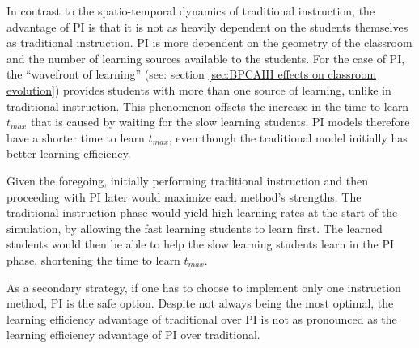 In contrast to the spatio-temporal dynamics of traditional instruction, the advantage of PI is that it is not as heavily dependent on the students themselves as traditional instruction.
PI is more dependent on the geometry of the classroom and the number of learning sources available to the students.
For the case of PI, the ``wavefront of learning'' (see: section \ref{sec:BPCAIH effects on classroom evolution}) provides students with more than one source of learning, unlike in traditional instruction. 
This phenomenon offsets the increase in the time to learn $t_{max}$ that is caused by waiting for the slow learning students.
PI models therefore have a shorter time to learn $t_{max}$, even though the traditional model initially has better learning efficiency.

Given the foregoing, initially performing traditional instruction and then proceeding with PI later would maximize each method's strengths. 
The traditional instruction phase would yield high learning rates at the start of the simulation, by allowing the fast learning students to learn first.
The learned students would then be able to help the slow learning students learn in the PI phase, shortening the time to learn $t_{max}$.

As a secondary strategy, if one has to choose to implement only one instruction method, PI is the safe option. Despite not always being the most optimal, the learning efficiency advantage of traditional over PI is not as pronounced as the learning efficiency advantage of PI over traditional.

